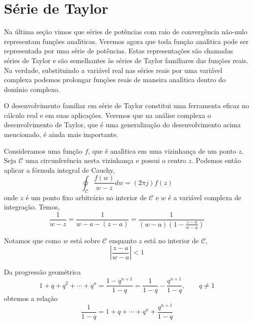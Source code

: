 \section{S\'{e}rie de Taylor}
Na \'{u}ltima se\c{c}\~{a}o vimos que s\'{e}ries de pot\^{e}ncias com raio de converg\^{e}ncia n\~{a}o-nulo representam fun\c{c}\~{o}es anal\'{\i}ticas. Veremos agora que toda fun\c{c}\~{a}o anal\'{\i}tica pode ser representada por uma s\'{e}rie de pot\^{e}ncias. Estas representa\c{c}\~{o}es s\~{a}o chamadas s\'{e}ries de Taylor e s\~{a}o semelhantes \`{a}s s\'{e}ries de Taylor familiares das fun\c{c}\~{o}es reais. Na verdade, substituindo a vari\'{a}vel real nas s\'{e}ries reais por uma vari\'{a}vel complexa podemos prolongar fun\c{c}\~{o}es reais de maneira anal\'{\i}tica dentro do dom\'{\i}nio complexo.


O desenvolvimento familiar em s\'{e}rie de Taylor constitui uma ferramenta eficaz no c\'{a}lculo real e em suas aplica\c{c}\~{o}es. Veremos que na an\'{a}lise complexa o desenvolvimento de Taylor, que \'{e} uma generaliza\c{c}\~{a}o do desenvolvimento acima mencionado, \'{e} ainda mais importante.

Consideramos uma fun\c{c}\~{a}o $f$, que \'{e} anal\'{\i}tica em uma vizinhan\c{c}a de um ponto $z$. Seja $\mathcal{C}$  uma circunfer\^{e}ncia  nesta vizinhan\c{c}a e possui o centro $z$. Podemos ent\~{a}o aplicar a f\'{o}rmula integral de Cauchy,
\begin{equation}\label{tay141:1}
\oint_{\mathcal{C}}\frac{f(w)}{w-z}dw=(2\pi j)f(z)
\end{equation}
onde $z$ \'{e} um ponto fixo arbitr\'{a}rio no interior de $\mathcal{C}$ e
$w$ \'{e} a vari\'{a}vel complexa de integra\c{c}\~{a}o. Temos,
\begin{equation}\label{tay141:2}
 \frac{1}{w - z}=\frac{1}{w - a - (z- a)}= \frac{1}{(w - a)( 1 - \frac{z - a}{w -
 a})}
\end{equation}

Notamos que como $w$ est\'{a} sobre $ \mathcal{C}$ enquanto $z$ est\'{a}
no interior de $ \mathcal{C}$,
\begin{equation}\label{tay141:3}
 \left|\frac{z - a}{w-a}\right| < 1
\end{equation}

Da progress\~{a}o geom\'{e}trica
\begin{equation*}
  1 + q + q^2 +\cdots+ q^n=\frac{1-q^{n+1}}{1- q}=\frac{1}{1- q}-\frac{q^{n+1}}{1- q},\qquad q\neq 1
\end{equation*}
obtemos a rela\c{c}\~{a}o
\begin{equation*}
\frac{1}{1-q}=1 +q +\cdots + q^n + \frac{q^{n+1}} {1- q}
\end{equation*}

